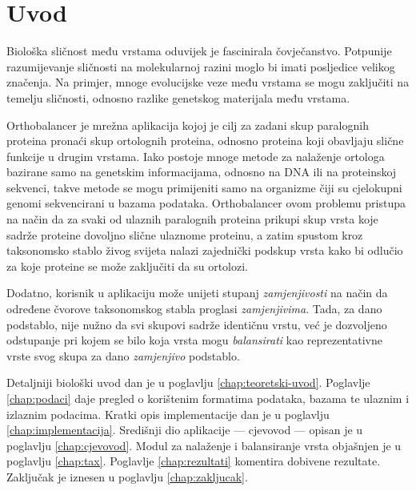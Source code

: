 \chapter{Uvod}
\label{chap:uvod}

Biološka sličnost među vrstama oduvijek je fascinirala čovječanstvo. Potpunije
razumijevanje sličnosti na molekularnoj razini moglo bi imati posljedice velikog
značenja. Na primjer, mnoge evolucijske veze među vrstama se mogu zaključiti na
temelju sličnosti, odnosno razlike genetskog materijala među vrstama.

Orthobalancer je mrežna aplikacija kojoj je cilj za zadani skup paralognih
proteina pronaći skup ortolognih proteina, odnosno proteina koji obavljaju
slične funkcije u drugim vrstama. Iako postoje mnoge metode za nalaženje
ortologa bazirane samo na genetskim informacijama, odnosno na DNA ili na
proteinskoj sekvenci, takve metode se mogu primijeniti samo na organizme čiji su
cjelokupni genomi sekvencirani u bazama podataka. Orthobalancer ovom problemu
pristupa na način da za svaki od ulaznih paralognih proteina prikupi skup vrsta
koje sadrže proteine dovoljno slične ulaznome proteinu, a zatim spustom kroz
taksonomsko stablo živog svijeta nalazi zajednički podskup vrsta kako bi odlučio
za koje proteine se može zaključiti da su ortolozi.

Dodatno, korisnik u aplikaciju može unijeti stupanj \emph{zamjenjivosti} na
način da određene čvorove taksonomskog stabla proglasi \emph{zamjenjivima}.
Tada, za dano podstablo, nije nužno da svi skupovi sadrže identičnu vrstu, već
je dozvoljeno odstupanje pri kojem se bilo koja vrsta mogu \emph{balansirati}
kao reprezentativne vrste svog skupa za dano \emph{zamjenjivo} podstablo.

Detaljniji biološki uvod dan je u poglavlju \ref{chap:teoretski-uvod}. Poglavlje
\ref{chap:podaci} daje pregled o korištenim formatima podataka, bazama te
ulaznim i izlaznim podacima. Kratki opis implementacije dan je u poglavlju
\ref{chap:implementacija}. Središnji dio aplikacije --- cjevovod --- opisan je u
poglavlju \ref{chap:cjevovod}. Modul za nalaženje i balansiranje vrsta objašnjen
je u poglavlju \ref{chap:tax}. Poglavlje \ref{chap:rezultati} komentira dobivene
rezultate. Zaključak je iznesen u poglavlju \ref{chap:zakljucak}.


 
